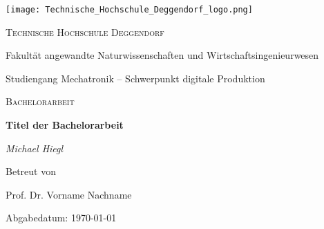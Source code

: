 \documentclass[11pt]{report}
\begin{document}
\begin{titlepage}
    \centering
    \texttt{[image: Technische\_Hochschule\_Deggendorf\_logo.png]}\par\vspace{1cm}
    {\scshape\LARGE Technische Hochschule Deggendorf \par}
    \vspace{1cm}
    {\Large Fakultät angewandte Naturwissenschaften und Wirtschaftsingenieurwesen\par}
    \vspace{1cm}
    {\Large Studiengang Mechatronik – Schwerpunkt digitale Produktion\par}
    \vspace{1cm}
    {\scshape\Large Bachelorarbeit\par}
    \vspace{1.5cm}
    {\huge\bfseries Titel der Bachelorarbeit\par}
    \vspace{2cm}
    {\Large\itshape Michael Hiegl\par}
    \vfill
    Betreut von\par
    Prof. Dr. Vorname Nachname

    \vfill

    {\large Abgabedatum: \today\par}
\end{titlepage}

\setcounter{page}{1} %

\cleardoublepage
{}
{} %
\tableofcontents
\newpage


\titleformat{\chapter}{\fontsize{14pt}{\baselineskip}\bfseries}{\thechapter}{1em}{}

\end{document}

